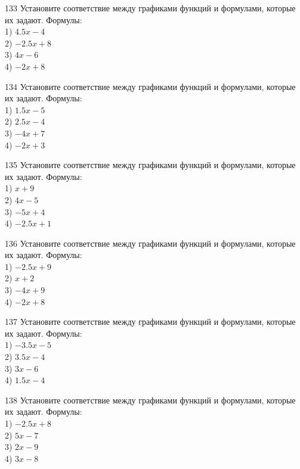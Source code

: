 \documentclass[4apaper]{article}
\begin{document}
\begin{taskBN}{133}
Установите соответствие между графиками функций и формулами, которые их задают. Формулы: \\1) $4.5x-4$\\2) $-2.5x+8$\\3) $4x-6$\\4) $-2x+8$
\end{taskBN}

\begin{taskBN}{134}
Установите соответствие между графиками функций и формулами, которые их задают. Формулы: \\1) $1.5x-5$\\2) $2.5x-4$\\3) $-4x+7$\\4) $-2x+3$
\end{taskBN}

\begin{taskBN}{135}
Установите соответствие между графиками функций и формулами, которые их задают. Формулы: \\1) $x+9$\\2) $4x-5$\\3) $-5x+4$\\4) $-2.5x+1$
\end{taskBN}

\begin{taskBN}{136}
Установите соответствие между графиками функций и формулами, которые их задают. Формулы: \\1) $-2.5x+9$\\2) $x+2$\\3) $-4x+9$\\4) $-2x+8$
\end{taskBN}

\begin{taskBN}{137}
Установите соответствие между графиками функций и формулами, которые их задают. Формулы: \\1) $-3.5x-5$\\2) $3.5x-4$\\3) $3x-6$\\4) $1.5x-4$
\end{taskBN}

\begin{taskBN}{138}
Установите соответствие между графиками функций и формулами, которые их задают. Формулы: \\1) $-2.5x+8$\\2) $5x-7$\\3) $2x-9$\\4) $3x-8$
\end{taskBN}
\end{document}
